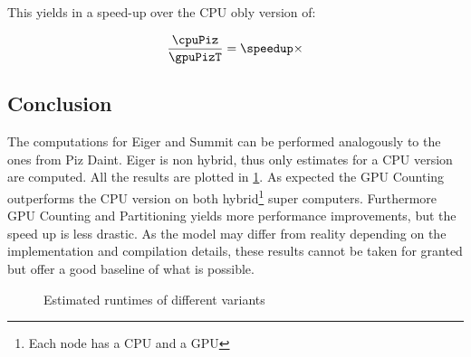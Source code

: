 \documentclass[]{article}
\begin{document}
This yields in a speed-up over the CPU obly version of:
\pgfmathsetmacro\speedup{\cpuPiz / \gpuPizT}
\begin{center}
	\begin{equation}
		\frac{\cpuPiz}{\gpuPizT} = \speedup \times
	\end{equation}
\end{center}

\vspace{5mm}

\pgfmathsetmacro{}
\pgfmathsetmacro{}
\pgfmathsetmacro{}
\pgfmathsetmacro{}


\subsection{Conclusion}

 
The computations for Eiger and Summit can be performed analogously to the ones from Piz Daint. Eiger is non hybrid, thus only estimates for a CPU version are computed. All the results are plotted in \ref{fig:exectimes}. As expected the GPU Counting outperforms the CPU version on both hybrid\footnote{Each node has a CPU and a GPU} super computers. Furthermore GPU Counting and Partitioning yields more performance improvements, but the speed up is less drastic. As the model may differ from reality depending on the implementation and compilation details, these results cannot be taken for granted but offer a good baseline of what is possible. 

\begin{figure}[H]
	\begin{center}
	\end{center}

\caption{Estimated runtimes of different variants}
\label{fig:exectimes}
\end{figure}
\end{document}
